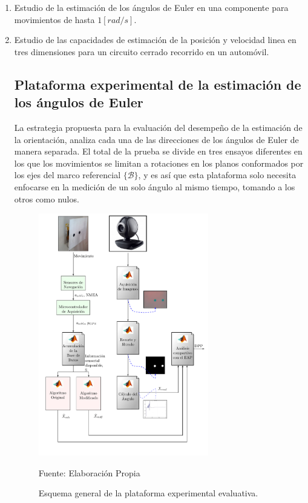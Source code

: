 \documentclass[conference]{IEEEtran}
\newcommand{\marco}[1]{\{\mathcal{#1}\}}
\begin{document}
\begin{enumerate}
\item Estudio de la estimación de los ángulos de Euler en una componente para movimientos de hasta $1[rad/s]$.
\item Estudio de las capacidades de estimación de la posición y velocidad linea en tres dimensiones para un circuito cerrado recorrido en un automóvil.
\subsection{Plataforma experimental de la estimación de los ángulos de Euler}\label{Plataforma2}
La estrategia propuesta para la evaluación del desempeño de la estimación de la orientación, analiza cada una de las direcciones de los ángulos de Euler de manera separada. El total de la prueba se divide en tres ensayos diferentes en los que los movimientos se limitan a rotaciones en los planos conformados por los ejes del marco referencial $\marco{B}$, y es así que esta plataforma solo necesita enfocarse en la medición de un solo ángulo al mismo tiempo, tomando a los otros como nulos.\par
\begin{figure}
\centering
\includegraphics[width=20em]{plataforma_fig10.pdf}
\caption{Esquema general de la plataforma experimental evaluativa.}
\scriptsize{Fuente: Elaboración Propia}
\label{plataforma_fig10}
\end{figure}

\end{enumerate}
\end{document}
